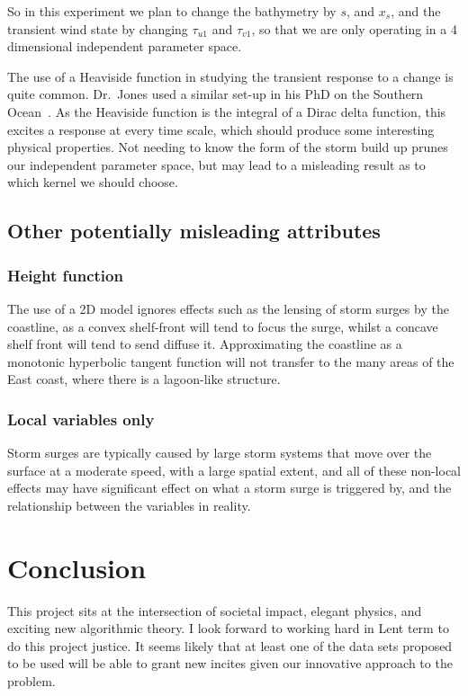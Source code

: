 \documentclass[usenames, dvipsnames, twocolumn]{article}
\begin{document}
So in this experiment we plan to change the bathymetry by
\(s\), and \(x_s\), and the transient wind state by changing \(\tau_{u1}\)
and \( \tau_{v1} \), so that we are only operating in a 4 dimensional independent parameter space.

The use of a Heaviside function in studying the transient response to a change is quite common.
Dr.\ Jones used a similar set-up in his PhD on the Southern Ocean~\cite{Jones2013Eddies}.
As the Heaviside function is the integral of a Dirac delta function, this excites a response at every time scale,
which should produce some interesting physical properties.
Not needing to know the form of the storm build up prunes our independent parameter space,
but may lead to a misleading result as to which kernel we should choose.

\subsection{Other potentially misleading attributes}
\subsubsection{Height function}
The use of a 2D model ignores effects such as the lensing of storm surges
by the coastline, as a convex shelf-front will tend to focus the surge,
whilst a concave shelf front will tend to send diffuse it.
Approximating the coastline as a monotonic hyperbolic tangent function
will not transfer to the many areas of the East coast, where there is
a lagoon-like structure.
\subsubsection{Local variables only}
Storm surges are typically caused by large storm systems that move
over the surface at a moderate speed, with a large spatial extent,
 and all of these non-local effects may have significant effect on what a storm
  surge is triggered by, and the relationship between the variables in reality.


\section{Conclusion}

This project sits at the intersection of societal impact,
elegant physics, and exciting new algorithmic theory.
I look forward to working hard in Lent term to do this project justice.
It seems likely that at least one of the data sets proposed to be used
will be able to grant new incites given our innovative approach
to the problem.



\printbibliography
\end{document}
